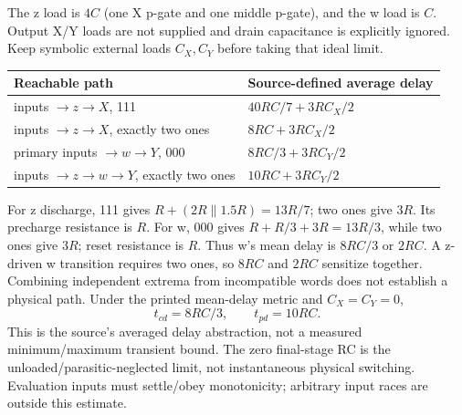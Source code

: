 \documentclass[10pt]{article}
\begin{document}
The z load is $4C$ (one X p-gate and one middle p-gate), and the w load is $C$. Output X/Y loads are not supplied and drain capacitance is explicitly ignored. Keep symbolic external loads $C_X,C_Y$ before taking that ideal limit.
\begin{center}\begin{tabular}{p{58mm}p{50mm}}\toprule Reachable path&Source-defined average delay\\\midrule
inputs $\to z\to X$, 111&$40RC/7+3RC_X/2$\\
inputs $\to z\to X$, exactly two ones&$8RC+3RC_X/2$\\
primary inputs $\to w\to Y$, 000&$8RC/3+3RC_Y/2$\\
inputs $\to z\to w\to Y$, exactly two ones&$10RC+3RC_Y/2$\\\bottomrule\end{tabular}\end{center}
For z discharge, 111 gives $R+(2R\parallel1.5R)=13R/7$; two ones give $3R$. Its precharge resistance is $R$. For w, 000 gives $R+R/3+3R=13R/3$, while two ones give $3R$; reset resistance is $R$. Thus w's mean delay is $8RC/3$ or $2RC$. A z-driven w transition requires two ones, so $8RC$ and $2RC$ sensitize together. Combining independent extrema from incompatible words does not establish a physical path. Under the printed mean-delay metric and $C_X=C_Y=0$,
\[\boxed{t_{cd}=8RC/3,\qquad t_{pd}=10RC.}\]
This is the source's averaged delay abstraction, not a measured minimum/maximum transient bound. The zero final-stage RC is the unloaded/parasitic-neglected limit, not instantaneous physical switching. Evaluation inputs must settle/obey monotonicity; arbitrary input races are outside this estimate.
\end{document}
